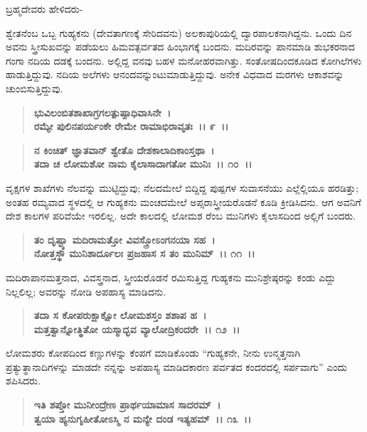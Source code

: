 \begin{flushleft}
 ಬ್ರಹ್ಮದೇವರು ಹೇಳಿದರು-
\end{flushleft}

ಶ್ವೇತನೆಂಬ ಒಬ್ಬ ಗುಹ್ಯಕನು (ದೇವತಾಗಣಕ್ಕೆ ಸೇರಿದವನು) ಅಲಕಾಪುರಿಯಲ್ಲಿ ದ್ವಾರಪಾಲಕನಾಗಿದ್ದನು. ಒಂದು ದಿನ ಅವನು ಸ್ತ್ರೀಸುಖವನ್ನು ಪಡೆಯಲು ಹಿಮವತ್ಪರ್ವತದ ಹಿಂಭಾಗಕ್ಕೆ ಬಂದನು. ಮದಿರವನ್ನು ಪಾನಮಾಡಿ ಶುಭಕರನಾದ ಗಂಗಾ ನದಿಯ ದಡಕ್ಕೆ ಬಂದನು. ಅಲ್ಲಿದ್ದ ವನವು ಬಹಳ ಮನೋಹರವಾಗಿತ್ತು. ಸಂತೋಷದಿಂದಕೂಡಿದ ಕೋಗಿಲೆಗಳು ಹಾಡುತ್ತಿದ್ದುವು. ನದಿಯ ಅಲೆಗಳು ಆನಂದವನ್ನುಂಟುಮಾಡುತ್ತಿದ್ದುವು. ಅನೇಕ ವಿಧವಾದ ಮರಗಳು ಆಕಾಶವನ್ನು ಚುಂಬಿಸುತ್ತಿದ್ದುವು.

\begin{verse}
\textbf{ಭುವಿಲಂಬಿತಶಾಖಾಗ್ರಗಲತ್ಪುಷ್ಪಾಧಿವಾಸಿನೇ~।}\\\textbf{ರಮ್ಯೇ ಪುಲಿನಪರ್ಯಂಕೇ ರೇಮೇ ರಾಮಾಭಿರಾವೃತಃ~।। ೯~।। }
\end{verse}

\begin{verse}
\textbf{ನ ಕಿಂಚಿತ್ ಜ್ಞಾತವಾನ್ ಶ್ವೇತೊ ದೇಶಕಾಲಾದಿಕಾಂಸ್ತಥಾ~।}\\\textbf{ತದಾ ಚ ಲೋಮಶೋ ನಾಮ ಕೈಲಾಸಾದಾಗತೋ ಮುನಿಃ~।। ೧೦~।।}
\end{verse}

ವೃಕ್ಷಗಳ ಶಾಖೆಗಳು ನೆಲವನ್ನು ಮುಟ್ಟಿದ್ದುವು; ನೆಲದಮೇಲೆ ಬಿದ್ದಿದ್ದ ಪುಷ್ಪಗಳ ಸುವಾಸನೆಯು ಎಲ್ಲೆಲ್ಲಿಯೂ ಹರಡಿತ್ತು; ಅಂತಹ ರಮ್ಯವಾದ ಸ್ಥಳದಲ್ಲಿ ಆ ಗುಹ್ಯಕನು ಮಂಚದಮೇಲೆ ಅಪ್ಸರಾಸ್ತ್ರೀಯರೊಡನೆ ಕೂಡಿ ಕ್ರೀಡಿಸಿದನು. ಆಗ ಅವನಿಗೆ ದೇಶ ಕಾಲಗಳ ಪರಿವೆಯೇ ಇರಲಿಲ್ಲ. ಅದೇ ಕಾಲದಲ್ಲಿ ಲೋಮಶ ರೆಂಬ ಮುನಿಗಳು ಕೈಲಾಸದಿಂದ ಅಲ್ಲಿಗೆ ಬಂದರು.

\begin{verse}
\textbf{ತಂ ದೃಷ್ಟ್ಯಾ ಮದಿರಾಮತ್ತೋ ವಿವಸ್ತ್ರೋಽಂಗನಯಾ ಸಹ~।}\\\textbf{ನೋತ್ತಸ್ಥೌ ಮುನಿಶಾರ್ದೂಲಃ ಪ್ರಜಹಾಸ ಸ ತಂ ಮುನಿಮ್~।। ೧೧~।।}
\end{verse}

ಮದಿರಾಪಾನಮತ್ತನಾದ, ವಿವಸ್ತ್ರನಾದ, ಸ್ತ್ರೀಯರೊಡನೆ ರಮಿಸುತ್ತಿದ್ದ ಗುಹ್ಯಕನು ಮುನಿಶ್ರೇಷ್ಠರನ್ನು ಕಂಡು ಎದ್ದು ನಿಲ್ಲಲಿಲ್ಲ; ಅವರನ್ನು ನೋಡಿ ಅಪಹಾಸ್ಯ ಮಾಡಿದನು.

\begin{verse}
\textbf{ತದಾ ಸ ಕೋಪರುಕ್ಷಾಕ್ಷೋ ಲೋಮಶಸ್ತಂ ಶಶಾಪ ಹ~।}\\\textbf{ಮತ್ತತ್ವಾನ್ನೋತ್ಥಿತೋ ಯಸ್ಮಾದ್ಭವ ವ್ಯಾಲೋದ್ರಿಕಂದರೇ~।। ೧೨~।।}
\end{verse}

ಲೋಮಶರು ಕೋಪದಿಂದ ಕಣ್ಣುಗಳನ್ನು ಕೆಂಪಗೆ ಮಾಡಿಕೊಂಡು “ಗುಹ್ಯಕನೇ, ನೀನು ಉನ್ಮತ್ತನಾಗಿ ಪ್ರತ್ಯುತ್ಥಾನಾದಿಗಳನ್ನು ಮಾಡದೇ ನನ್ನನ್ನು ಅಪಹಾಸ್ಯ ಮಾಡಿದಕಾರಣ ಪರ್ವತದ ಕಂದರದಲ್ಲಿ ಸರ್ಪವಾಗು” ಎಂದು ಶಪಿಸಿದರು.

\begin{verse}
\textbf{ಇತಿ ಶಪ್ತೋ ಮುನೀಂದ್ರೇಣ ಪ್ರಾರ್ಥಯಾಮಾಸ ಸಾದರಮ್~।}\\\textbf{ತ್ವಯಾ ಹ್ಯನುಗೃಹೀತೋಽಸ್ಮಿ ನ ಮನ್ಯೇ ದಂಡ ಇತ್ಯಹಮ್~।। ೧೩~।।}
\end{verse}

